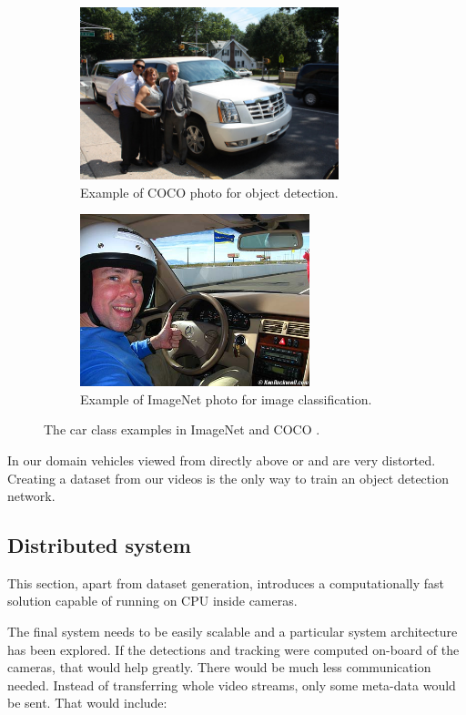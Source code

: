 \documentclass[a4paper,12pt,titlepage, twoside]{article}
\numberwithin{figure}{section}
\begin{document}
\begin{figure}[h!]
    \begin{subfigure}[Sample1]{0.5\linewidth}
        \includegraphics[height=50mm]{fig/coco0.jpg}
        \caption{Example of COCO photo for object detection.}
        \label{fig:coco0}
    \end{subfigure}
    \qquad
    \begin{subfigure}[Sample1]{0.5\linewidth}    
        \includegraphics[height=50mm]{fig/imagenet3.jpg}  
        \caption{Example of ImageNet photo for image classification.}
        \label{fig:imagenet3}  
    \end{subfigure} 
    \caption{The car class examples in ImageNet \cite{krizhevsky2012imagenet} and COCO \cite{lin2014microsoft}.}
\end{figure}



In our domain vehicles viewed from directly above or and are very distorted. Creating a dataset from our videos is the only way to train an object detection network. 


\subsection{Distributed system}
This section, apart from dataset generation, introduces a computationally fast solution capable of running on CPU inside cameras.

The final system needs to be easily scalable and a particular system architecture has been explored. If the detections and tracking were computed on-board of the cameras, that would help greatly. There would be much less communication needed. Instead of transferring whole video streams, only some meta-data would be sent. That would include: 
\end{document}
